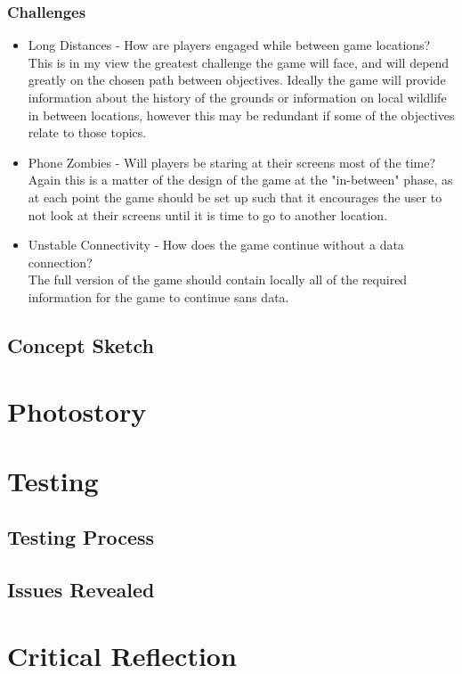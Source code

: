 \documentclass[12pt, a4paper]{article}
\begin{document}
\subsubsection{Challenges}
\begin{itemize}
  \item Long Distances - How are players engaged while between game locations?\\
        This is in my view the greatest challenge the game will face, and will depend greatly on the chosen path between objectives.
        Ideally the game will provide information about the history of the grounds or information on local wildlife in between locations, however this may be redundant if some of the objectives relate to those topics.
  \item Phone Zombies - Will players be staring at their screens most of the time?\\
        Again this is a matter of the design of the game at the "in-between" phase, as at each point the game should be set up such that it encourages the user to not look at their screens until it is time to go to another location.
  \item Unstable Connectivity - How does the game continue without a data connection?\\
        The full version of the game should contain locally all of the required information for the game to continue sans data.
\end{itemize}

\subsection{Concept Sketch}

\section{Photostory}

\section{Testing}
\subsection{Testing Process}
\subsection{Issues Revealed}

\section{Critical Reflection}
\end{document}
